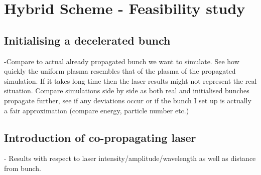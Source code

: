 \section{Hybrid Scheme - Feasibility study}
\subsection{Initialising a decelerated bunch}
-Compare to actual already propagated bunch we want to simulate. See how quickly the uniform plasma resembles that of the plasma of the propagated simulation. If it takes long time then the laser results might not represent the real situation.  Compare simulations side by side as both real and initialised bunches propagate further, see if any deviations occur or if the bunch I set up is actually a fair approximation (compare energy, particle number etc.)
\subsection{Introduction of co-propagating laser}
- Results with respect to laser intensity/amplitude/wavelength as well as distance from bunch.


